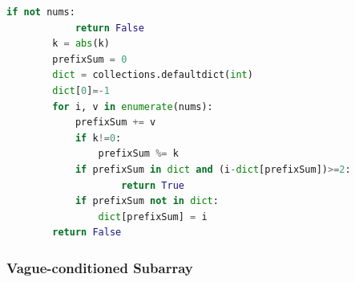 \documentclass[../specific-algorithms.tex]{subfiles}
\begin{document}
\begin{enumerate}
\begin{lstlisting}[language=Python]
        if not nums:
            return False
        k = abs(k)
        prefixSum = 0
        dict = collections.defaultdict(int)
        dict[0]=-1
        for i, v in enumerate(nums):
            prefixSum += v
            if k!=0:
                prefixSum %= k
            if prefixSum in dict and (i-dict[prefixSum])>=2:
                    return True
            if prefixSum not in dict:
                dict[prefixSum] = i
        return False
\end{lstlisting}
\end{enumerate}
\subsubsection{Vague-conditioned Subarray}

\end{document}
